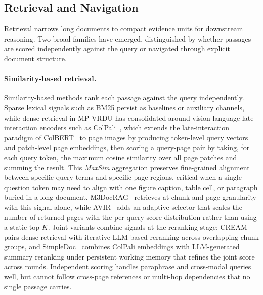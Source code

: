 \documentclass[11pt]{article}
\begin{document}
\subsection{Retrieval and Navigation}
\label{sec:tf-retrieval}

Retrieval narrows long documents to compact evidence units for downstream reasoning. Two broad families have emerged, distinguished by whether passages are scored independently against the query or navigated through explicit document structure.

\paragraph{Similarity-based retrieval.} Similarity-based methods rank each passage against the query independently. Sparse lexical signals such as BM25 persist as baselines or auxiliary channels, while dense retrieval in MP-VRDU has consolidated around vision-language late-interaction encoders such as ColPali~\cite{faysse2024colpali}, which extends the late-interaction paradigm of ColBERT~\cite{khattab2020colbert} to page images by producing token-level query vectors and patch-level page embeddings, then scoring a query-page pair by taking, for each query token, the maximum cosine similarity over all page patches and summing the result. This \emph{MaxSim} aggregation preserves fine-grained alignment between specific query terms and specific page regions, critical when a single question token may need to align with one figure caption, table cell, or paragraph buried in a long document. M3DocRAG~\cite{cho2024m3docrag} retrieves at chunk and page granularity with this signal alone, while AVIR~\cite{li2025avir} adds an adaptive selector that scales the number of returned pages with the per-query score distribution rather than using a static top-$K$. Joint variants combine signals at the reranking stage: CREAM~\cite{zhang2024cream} pairs dense retrieval with iterative LLM-based reranking across overlapping chunk groups, and SimpleDoc~\cite{jain2025simpledoc} combines ColPali embeddings with LLM-generated summary reranking under persistent working memory that refines the joint score across rounds. Independent scoring handles paraphrase and cross-modal queries well, but cannot follow cross-page references or multi-hop dependencies that no single passage carries.
\end{document}
